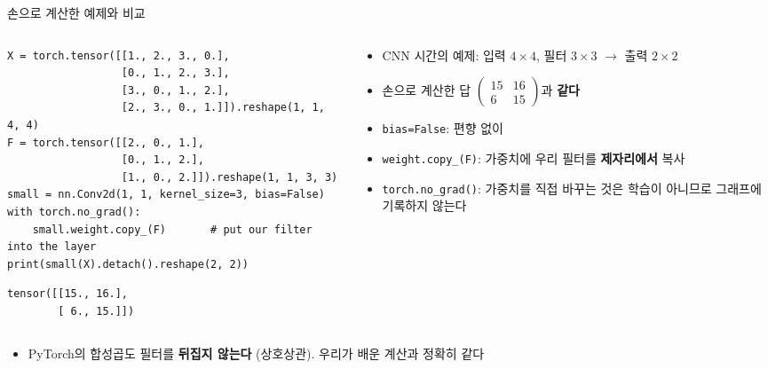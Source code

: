 \documentclass[aspectratio=169,11pt]{beamer}
\newcommand{\codesmall}{\ttfamily\fontsize{7.4}{8.3}\selectfont}
\newcommand{\code}[1]{\texttt{#1}}
\begin{document}
\begin{frame}[fragile]{손으로 계산한 예제와 비교}
\begin{columns}[T,onlytextwidth]
\begin{column}{0.56\textwidth}
\begin{lstlisting}[basicstyle=\codesmall]
X = torch.tensor([[1., 2., 3., 0.],
                  [0., 1., 2., 3.],
                  [3., 0., 1., 2.],
                  [2., 3., 0., 1.]]).reshape(1, 1, 4, 4)
F = torch.tensor([[2., 0., 1.],
                  [0., 1., 2.],
                  [1., 0., 2.]]).reshape(1, 1, 3, 3)
small = nn.Conv2d(1, 1, kernel_size=3, bias=False)
with torch.no_grad():
    small.weight.copy_(F)       # put our filter into the layer
print(small(X).detach().reshape(2, 2))
\end{lstlisting}
\begin{lstlisting}[style=outstyle]
tensor([[15., 16.],
        [ 6., 15.]])
\end{lstlisting}
\end{column}
\begin{column}{0.40\textwidth}
\small
\begin{itemize}
\item CNN 시간의 예제: 입력 $4\times4$, 필터 $3\times3$ $\to$ 출력 $2\times2$
\item 손으로 계산한 답 $\begin{pmatrix}15&16\\6&15\end{pmatrix}$과 \textbf{같다}
\item \code{bias=False}: 편향 없이
\item \code{weight.copy\_(F)}: 가중치에 우리 필터를 \textbf{제자리에서} 복사
\item \code{torch.no\_grad()}: 가중치를 직접 바꾸는 것은 학습이 아니므로 그래프에 기록하지 않는다
\end{itemize}
\end{column}
\end{columns}
\vskip1mm
\small
\begin{itemize}
\item PyTorch의 합성곱도 필터를 \textbf{뒤집지 않는다} (상호상관). 우리가 배운 계산과 정확히 같다
\end{itemize}
\end{frame}
\end{document}

